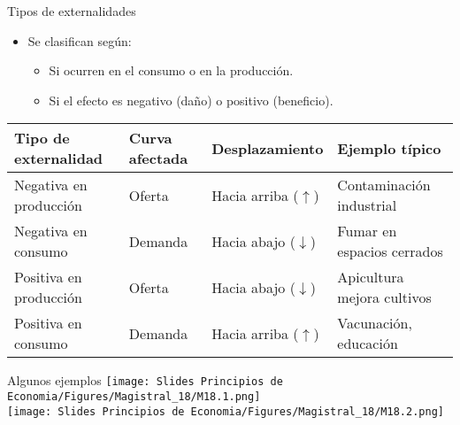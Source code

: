 \documentclass{beamer}
\begin{document}
\begin{frame}{Tipos de externalidades}
    \small
    \begin{itemize}
        \item Se clasifican según:
        \begin{itemize}
            \item Si ocurren en el consumo o en la producción.
            \item Si el efecto es negativo (daño) o positivo (beneficio).
        \end{itemize}
    \end{itemize}

    \vspace{0.3cm}
    \begin{table}[]
    \centering
    \scriptsize
     \renewcommand{\arraystretch}{1.8}
    \begin{tabular}{|m{2.88cm}|m{1.95cm}|m{1.95cm}|m{3.35cm}|}
        \hline
        \rowcolor{blue!20}
        \textbf{Tipo de externalidad} & \textbf{Curva afectada} & \textbf{Desplazamiento} & \textbf{Ejemplo típico} \\
        \hline
        Negativa en producción  & Oferta  & Hacia arriba (\( \uparrow \)) & Contaminación industrial \\
        \hline
        Negativa en consumo     & Demanda & Hacia abajo (\( \downarrow \)) & Fumar en espacios cerrados \\
        \hline
        Positiva en producción  & Oferta  & Hacia abajo (\( \downarrow \)) & Apicultura mejora cultivos \\
        \hline
        Positiva en consumo     & Demanda & Hacia arriba (\( \uparrow \)) & Vacunación, educación \\
        \hline
    \end{tabular}
    \end{table}
\end{frame}


\begin{frame}{Algunos ejemplos}
\centering  
\texttt{[image: Slides Principios de Economia/Figures/Magistral\_18/M18.1.png]} \\
\vspace{5mm}
\texttt{[image: Slides Principios de Economia/Figures/Magistral\_18/M18.2.png]} 

\end{frame}
\end{document}
